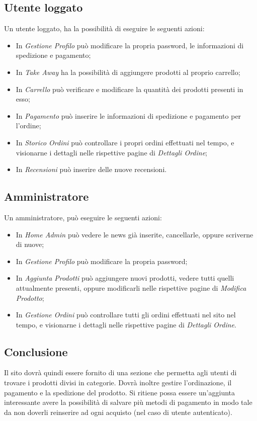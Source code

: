 \documentclass{article}
\begin{document}
			\subsection{Utente loggato}
			    Un utente loggato, ha la possibilità di eseguire le seguenti azioni:
			    \begin{itemize}
			        \item In \textit{Gestione Profilo} può modificare la propria password, le informazioni di spedizione e pagamento;
			        \item In \textit{Take Away} ha la possibilità di aggiungere prodotti al proprio carrello;
			        \item In \textit{Carrello} può verificare e modificare la quantità dei prodotti presenti in esso;
			        \item In \textit{Pagamento} può inserire le informazioni di spedizione e pagamento per l'ordine;
			        \item In \textit{Storico Ordini} può controllare i propri ordini effettuati nel tempo, e visionarne i dettagli nelle rispettive pagine di \textit{Dettagli Ordine};
			        \item In \textit{Recensioni} può inserire delle nuove recensioni.
			    \end{itemize}
			\subsection{Amministratore}
			    Un amministratore, può eseguire le seguenti azioni:
			    \begin{itemize}
			        \item In \textit{Home Admin} può vedere le news già inserite, cancellarle, oppure scriverne di nuove;
			        \item In \textit{Gestione Profilo} può modificare la propria password;
			        \item In \textit{Aggiunta Prodotti} può aggiungere nuovi prodotti, vedere tutti quelli attualmente presenti, oppure modificarli nelle rispettive pagine di \textit{Modifica Prodotto};
			        \item In \textit{Gestione Ordini} può controllare tutti gli ordini effettuati nel sito nel tempo, e visionarne i dettagli nelle rispettive pagine di \textit{Dettagli Ordine}.
			    \end{itemize}
		\subsection{Conclusione}
			Il sito dovrà quindi essere fornito di una sezione che permetta agli utenti di trovare i prodotti divisi in categorie. Dovrà inoltre gestire l'ordinazione, il pagamento e la spedizione del prodotto.
			Si ritiene possa essere un'aggiunta interessante avere la possibilità di salvare più metodi di pagamento in modo tale da non doverli reinserire ad ogni acquisto (nel caso di utente autenticato).	
\end{document}
